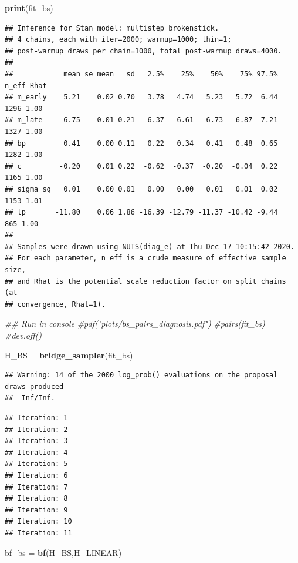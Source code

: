 \documentclass[
]{article}
\newenvironment{Shaded}{\begin{snugshade}}{\end{snugshade}}
\newcommand{\CommentTok}[1]{\textcolor[rgb]{0.56,0.35,0.01}{\textit{#1}}}
\newcommand{\KeywordTok}[1]{\textcolor[rgb]{0.13,0.29,0.53}{\textbf{#1}}}
\newcommand{\NormalTok}[1]{#1}
\newcommand{\StringTok}[1]{\textcolor[rgb]{0.31,0.60,0.02}{#1}}
\begin{document}
\begin{Shaded}
\begin{Highlighting}[]
\KeywordTok{print}\NormalTok{(fit_bs)}
\end{Highlighting}
\end{Shaded}

\begin{verbatim}
## Inference for Stan model: multistep_brokenstick.
## 4 chains, each with iter=2000; warmup=1000; thin=1; 
## post-warmup draws per chain=1000, total post-warmup draws=4000.
## 
##            mean se_mean   sd   2.5%    25%    50%    75% 97.5% n_eff Rhat
## m_early    5.21    0.02 0.70   3.78   4.74   5.23   5.72  6.44  1296 1.00
## m_late     6.75    0.01 0.21   6.37   6.61   6.73   6.87  7.21  1327 1.00
## bp         0.41    0.00 0.11   0.22   0.34   0.41   0.48  0.65  1282 1.00
## c         -0.20    0.01 0.22  -0.62  -0.37  -0.20  -0.04  0.22  1165 1.00
## sigma_sq   0.01    0.00 0.01   0.00   0.00   0.01   0.01  0.02  1153 1.01
## lp__     -11.80    0.06 1.86 -16.39 -12.79 -11.37 -10.42 -9.44   865 1.00
## 
## Samples were drawn using NUTS(diag_e) at Thu Dec 17 10:15:42 2020.
## For each parameter, n_eff is a crude measure of effective sample size,
## and Rhat is the potential scale reduction factor on split chains (at 
## convergence, Rhat=1).
\end{verbatim}

\begin{Shaded}
\begin{Highlighting}[]
\CommentTok{## Run in console}
\CommentTok{#pdf("plots/bs_pairs_diagnosis.pdf")}
\CommentTok{#pairs(fit_bs)}
\CommentTok{#dev.off()}

\NormalTok{H_BS =}\StringTok{ }\KeywordTok{bridge_sampler}\NormalTok{(fit_bs)}
\end{Highlighting}
\end{Shaded}

\begin{verbatim}
## Warning: 14 of the 2000 log_prob() evaluations on the proposal draws produced
## -Inf/Inf.
\end{verbatim}

\begin{verbatim}
## Iteration: 1
## Iteration: 2
## Iteration: 3
## Iteration: 4
## Iteration: 5
## Iteration: 6
## Iteration: 7
## Iteration: 8
## Iteration: 9
## Iteration: 10
## Iteration: 11
\end{verbatim}

\begin{Shaded}
\begin{Highlighting}[]
\NormalTok{bf_bs =}\StringTok{ }\KeywordTok{bf}\NormalTok{(H_BS,H_LINEAR)}
\end{Highlighting}
\end{Shaded}
\end{document}
